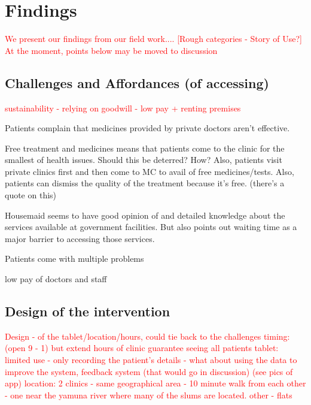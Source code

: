 \section{Findings}
\begin{comment}
This will form the chunk of your writing. I have sometimes iterated through these in written form, or else made a rough outline  on paper and then put it down. It is best that we talk about this section before you attempt to write. Depending on the structure of this section, you might label the section Findings or Analysis. The thing to remember is that all of your data goes into this section, and you need to weave a story around your data that is compelling, novel, and forms the central theme of the paper. If you have done qualitative work, make sure you include these quotes in the findings. Most importantly, do not tell a story based on quotes you have. Pick quotes based on the story you want to tell.

STORY OF USE
\end{comment}
\textcolor{red}{We present our findings from our field work.... [Rough categories - Story of Use?] At the moment, points below may be moved to discussion}

\subsection{Challenges and Affordances (of accessing)}
\textcolor{red}{sustainability - relying on goodwill - low pay + renting premises}

Patients complain that medicines provided by private doctors aren't effective.

Free treatment and medicines means that patients come to the clinic for the smallest of health issues. Should this be deterred? How? Also, patients visit private clinics first and then come to MC to avail of free medicines/tests. Also, patients can dismiss the quality of the treatment because it’s free. (there’s a quote on this)

Housemaid seems to have good opinion of and detailed knowledge about the services available at government facilities. But also points out waiting time as a major barrier to accessing those services.

Patients come with multiple problems 

low pay of doctors and staff

\subsection{Design of the intervention}
\textcolor{red}{Design - of the tablet/location/hours, could tie back to the challenges
timing: (open 9 - 1) but extend hours of clinic
guarantee seeing all patients
tablet: limited use - only recording the patient's details - what about using the data to improve the system, feedback system (that would go in discussion) (see pics of app)
location: 2 clinics - same geographical area - 10 minute walk from each other - one near the yamuna river where many of the slums are located. other - flats}

